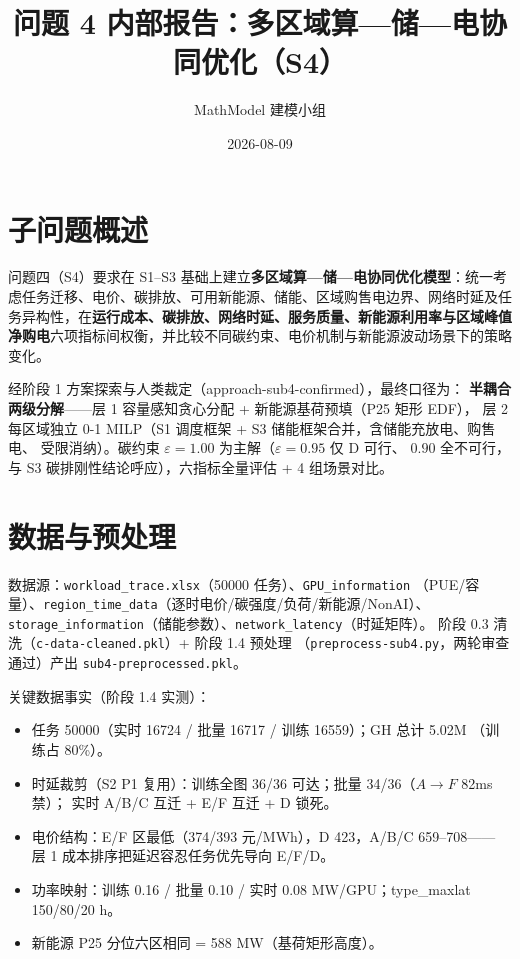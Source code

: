 \documentclass{internal-report}
\title{问题 4 内部报告：多区域算—储—电协同优化（S4）}
\author{MathModel 建模小组}
\date{2026-08-09}
\begin{document}
\maketitle

\section{子问题概述}

问题四（S4）要求在 S1--S3 基础上建立\textbf{多区域算—储—电协同优化模型}：统一考虑任务迁移、电价、碳排放、可用新能源、储能、区域购售电边界、网络时延及任务异构性，在\textbf{运行成本、碳排放、网络时延、服务质量、新能源利用率与区域峰值净购电}六项指标间权衡，并比较不同碳约束、电价机制与新能源波动场景下的策略变化。

经阶段 1 方案探索与人类裁定（approach-sub4-confirmed），最终口径为：
\textbf{半耦合两级分解}——层 1 容量感知贪心分配 + 新能源基荷预填（P25 矩形 EDF），
层 2 每区域独立 0-1 MILP（S1 调度框架 + S3 储能框架合并，含储能充放电、购售电、
受限消纳）。碳约束 $\varepsilon{=}1.00$ 为主解（$\varepsilon{=}0.95$ 仅 D 可行、
$0.90$ 全不可行，与 S3 碳排刚性结论呼应），六指标全量评估 + 4 组场景对比。

\section{数据与预处理}

数据源：\texttt{workload\_trace.xlsx}（50000 任务）、\texttt{GPU\_information}
（PUE/容量）、\texttt{region\_time\_data}（逐时电价/碳强度/负荷/新能源/NonAI）、
\texttt{storage\_information}（储能参数）、\texttt{network\_latency}（时延矩阵）。
阶段 0.3 清洗（\texttt{c-data-cleaned.pkl}）+ 阶段 1.4 预处理
（\texttt{preprocess-sub4.py}，两轮审查通过）产出 \texttt{sub4-preprocessed.pkl}。

关键数据事实（阶段 1.4 实测）：
\begin{itemize}
  \item 任务 50000（实时 16724 / 批量 16717 / 训练 16559）；GH 总计 5.02M
        （训练占 80\%）。
  \item 时延裁剪（S2 P1 复用）：训练全图 36/36 可达；批量 34/36（$A\to F$ 82ms 禁）；
        实时 A/B/C 互迁 + E/F 互迁 + D 锁死。
  \item 电价结构：E/F 区最低（374/393 元/MWh），D 423，A/B/C 659--708——
        层 1 成本排序把延迟容忍任务优先导向 E/F/D。
  \item 功率映射：训练 0.16 / 批量 0.10 / 实时 0.08 MW/GPU；type\_maxlat
        150/80/20 h。
  \item 新能源 P25 分位六区相同 = 588 MW（基荷矩形高度）。
\end{itemize}
\end{document}
